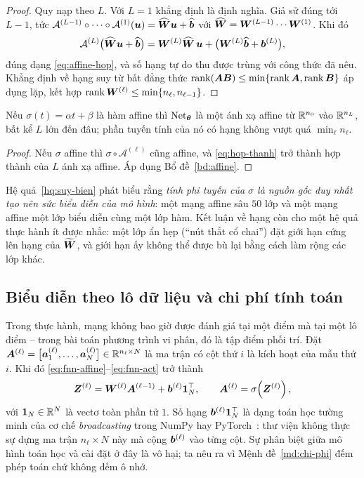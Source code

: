 \begin{proof}
Quy nạp theo $L$. Với $L = 1$ khẳng định là định nghĩa. Giả sử đúng tới $L-1$,
tức $\mathcal{A}^{(L-1)}\circ\cdots\circ\mathcal{A}^{(1)}(\bm{u})
 = \widehat{\bm{W}}\bm{u} + \widehat{\bm{b}}$ với
$\widehat{\bm{W}} = \bm{W}^{(L-1)}\cdots\bm{W}^{(1)}$. Khi đó
\[
\mathcal{A}^{(L)}\big(\widehat{\bm{W}}\bm{u} + \widehat{\bm{b}}\big)
 = \bm{W}^{(L)}\widehat{\bm{W}}\,\bm{u}
 + \big(\bm{W}^{(L)}\widehat{\bm{b}} + \bm{b}^{(L)}\big),
\]
đúng dạng \eqref{eq:affine-hop}, và số hạng tự do thu được trùng với công thức
đã nêu. Khẳng định về hạng suy từ bất đẳng thức
$\operatorname{rank}(\bm{A}\bm{B}) \le \min\{\operatorname{rank} \bm{A}, \operatorname{rank} \bm{B}\}$ áp dụng lặp, kết
hợp $\operatorname{rank} \bm{W}^{(\ell)} \le \min\{n_\ell, n_{\ell-1}\}$.
\end{proof}
 
\begin{hequa}
\label{hq:suy-bien}
Nếu $\sigma(t) = \alpha t + \beta$ là hàm affine thì $\operatorname{Net}_{\bm{\theta}}$ là một ánh
xạ affine từ $\mathbb{R}^{n_0}$ vào $\mathbb{R}^{n_L}$, bất kể $L$ lớn đến đâu; phần tuyến tính
của nó có hạng không vượt quá $\min_{\ell} n_\ell$.
\end{hequa}
 
\begin{proof}
Nếu $\sigma$ affine thì $\sigma \circ \mathcal{A}^{(\ell)}$ cũng affine, và
\eqref{eq:hop-thanh} trở thành hợp thành của $L$ ánh xạ affine. Áp dụng Bổ
đề~\ref{bd:affine}.
\end{proof}
 
Hệ quả~\ref{hq:suy-bien} phát biểu rằng \emph{tính phi tuyến của $\sigma$ là
nguồn gốc duy nhất tạo nên sức biểu diễn của mô hình}: một mạng affine sâu $50$
lớp và một mạng affine một lớp biểu diễn cùng một lớp hàm. Kết luận về hạng còn
cho một hệ quả thực hành ít được nhắc: một lớp ẩn hẹp (``nút thắt cổ chai'') đặt
giới hạn cứng lên hạng của $\widetilde{\bm{W}}$, và giới hạn ấy không thể được bù
lại bằng cách làm rộng các lớp khác.
 
\subsection{Biểu diễn theo lô dữ liệu và chi phí tính toán}
\label{subsec:bieu-dien-ma-tran}
 
Trong thực hành, mạng không bao giờ được đánh giá tại một điểm mà tại một lô
điểm -- trong bài toán phương trình vi phân, đó là tập điểm phối trí. Đặt
$\bm{A}^{(\ell)} = \big[\bm{a}^{(\ell)}_1, \dots, \bm{a}^{(\ell)}_N\big]
\in \mathbb{R}^{n_\ell \times N}$ là ma trận có cột thứ $i$ là kích hoạt của mẫu thứ
$i$. Khi đó \eqref{eq:fnn-affine}--\eqref{eq:fnn-act} trở thành
\begin{equation}
\bm{Z}^{(\ell)} = \bm{W}^{(\ell)} \bm{A}^{(\ell-1)}
  + \bm{b}^{(\ell)} \bm{1}_N^{\top},
\qquad
\bm{A}^{(\ell)} = \sigma\!\left(\bm{Z}^{(\ell)}\right),
\label{eq:batch}
\end{equation}
với $\bm{1}_N \in \mathbb{R}^N$ là vectơ toàn phần tử $1$. Số hạng
$\bm{b}^{(\ell)} \bm{1}_N^{\top}$ là dạng toán học tường minh của cơ chế
\emph{broadcasting} trong NumPy hay PyTorch~\cite{paszke2019}: thư viện không
thực sự dựng ma trận $n_\ell \times N$ này mà cộng $\bm{b}^{(\ell)}$ vào từng cột.
Sự phân biệt giữa mô hình toán học và cài đặt ở đây là vô hại; ta nêu ra vì
Mệnh đề~\ref{md:chi-phi} đếm phép toán chứ không đếm ô nhớ.
 
